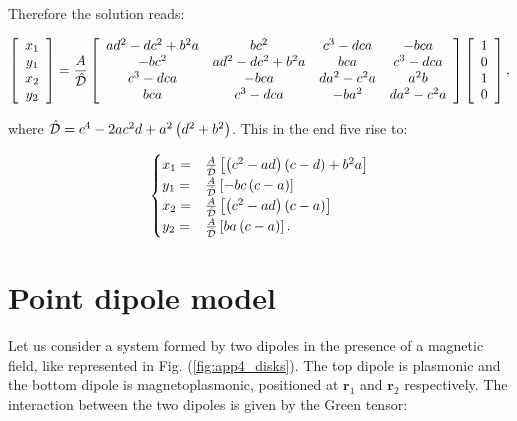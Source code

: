 Therefore the solution reads:

\begin{equation}
\left[\begin{array}{c}
x_{1}\\
y_{1}\\
x_{2}\\
y_{2}
\end{array}\right]=\frac{A}{\hat{{\cal D}}}\left[\begin{array}{cccc}
ad^{2}-dc^{2}+b^{2}a & bc^{2} & c^{3}-dca & -bca\\
-bc^{2} & ad^{2}-dc^{2}+b^{2}a & bca & c^{3}-dca\\
c^{3}-dca & -bca & da^{2}-c^{2}a & a^{2}b\\
bca & c^{3}-dca & -ba^{2} & da^{2}-c^{2}a
\end{array}\right]\left[\begin{array}{c}
1\\
0\\
1\\
0
\end{array}\right],
\end{equation}

where $\hat{{\cal{D}}}=c^4-2ac^2d +a^2\left(d^2 + b^2\right)$.  This in the end five rise to:

\begin{equation}
\begin{cases}
x_{1}= & \frac{A}{\hat{{\cal D}}}\left[\left(c^{2}-ad\right)\left(c-d\right)+b^{2}a\right]\\
y_{1}= & \frac{A}{\hat{{\cal D}}}\left[-bc\left(c-a\right)\right]\\
x_{2}= & \frac{A}{\hat{{\cal D}}}\left[\left(c^{2}-ad\right)\left(c-a\right)\right]\\
y_{2}= & \frac{A}{\hat{{\cal D}}}\left[ba\left(c-a\right)\right].
\end{cases}
\end{equation}

\section{Point dipole model\label{App:coupled_oscillators}}

Let us consider a system formed by two dipoles in the presence of a magnetic field, like represented in Fig. (\ref{fig:app4_disks}). The top dipole is plasmonic and the bottom dipole is magnetoplasmonic, positioned at $\mathbf{r}_1$ and $\mathbf{r}_{2}$ respectively.
The interaction between the two dipoles is given by the Green tensor:

